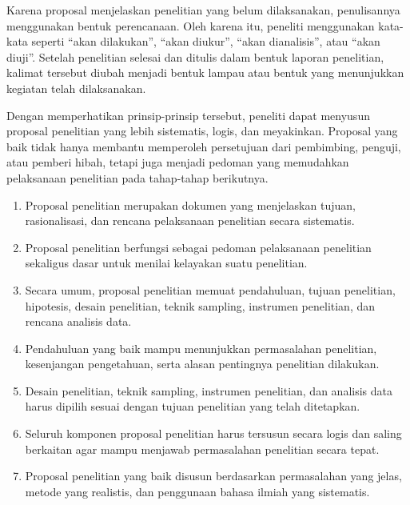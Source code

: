 \documentclass[
  indonesian,
  letterpaper,
  DIV=11,
  numbers=noendperiod]{scrreprt}
\providecommand{\tightlist}{%
  \setlength{\itemsep}{0pt}\setlength{\parskip}{0pt}}
\begin{document}
\begin{enumerate}
  Karena proposal menjelaskan penelitian yang belum dilaksanakan,
  penulisannya menggunakan bentuk perencanaan. Oleh karena itu, peneliti
  menggunakan kata-kata seperti ``akan dilakukan'', ``akan diukur'',
  ``akan dianalisis'', atau ``akan diuji''. Setelah penelitian selesai
  dan ditulis dalam bentuk laporan penelitian, kalimat tersebut diubah
  menjadi bentuk lampau atau bentuk yang menunjukkan kegiatan telah
  dilaksanakan.
\end{enumerate}

Dengan memperhatikan prinsip-prinsip tersebut, peneliti dapat menyusun
proposal penelitian yang lebih sistematis, logis, dan meyakinkan.
Proposal yang baik tidak hanya membantu memperoleh persetujuan dari
pembimbing, penguji, atau pemberi hibah, tetapi juga menjadi pedoman
yang memudahkan pelaksanaan penelitian pada tahap-tahap berikutnya.

\begin{tcolorbox}[enhanced jigsaw, colframe=quarto-callout-tip-color-frame, toptitle=1mm, breakable, leftrule=.75mm, arc=.35mm, toprule=.15mm, colback=white, colbacktitle=quarto-callout-tip-color!10!white, bottomtitle=1mm, bottomrule=.15mm, titlerule=0mm, title=\textcolor{quarto-callout-tip-color}{\faLightbulb}\hspace{0.5em}{Rangkuman}, coltitle=black, left=2mm, opacitybacktitle=0.6, opacityback=0, rightrule=.15mm]

\begin{enumerate}
\def\labelenumi{\arabic{enumi}.}
\tightlist
\item
  Proposal penelitian merupakan dokumen yang menjelaskan tujuan,
  rasionalisasi, dan rencana pelaksanaan penelitian secara sistematis.
\item
  Proposal penelitian berfungsi sebagai pedoman pelaksanaan penelitian
  sekaligus dasar untuk menilai kelayakan suatu penelitian.
\item
  Secara umum, proposal penelitian memuat pendahuluan, tujuan
  penelitian, hipotesis, desain penelitian, teknik sampling, instrumen
  penelitian, dan rencana analisis data.
\item
  Pendahuluan yang baik mampu menunjukkan permasalahan penelitian,
  kesenjangan pengetahuan, serta alasan pentingnya penelitian dilakukan.
\item
  Desain penelitian, teknik sampling, instrumen penelitian, dan analisis
  data harus dipilih sesuai dengan tujuan penelitian yang telah
  ditetapkan.
\item
  Seluruh komponen proposal penelitian harus tersusun secara logis dan
  saling berkaitan agar mampu menjawab permasalahan penelitian secara
  tepat.
\item
  Proposal penelitian yang baik disusun berdasarkan permasalahan yang
  jelas, metode yang realistis, dan penggunaan bahasa ilmiah yang
  sistematis.
\end{enumerate}

\end{tcolorbox}
\end{document}
